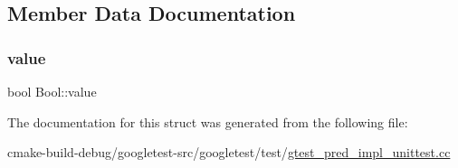 \subsection{Member Data Documentation}
\mbox{\label{structBool_a16be863c269f988cdcbe59f9d846a141}} 
\subsubsection{\texorpdfstring{value}{value}}
{\footnotesize\ttfamily bool Bool\+::value}



The documentation for this struct was generated from the following file\+:\begin{DoxyCompactItemize}
\item 
cmake-\/build-\/debug/googletest-\/src/googletest/test/\mbox{\hyperlink{gtest__pred__impl__unittest_8cc}{gtest\+\_\+pred\+\_\+impl\+\_\+unittest.\+cc}}\end{DoxyCompactItemize}
